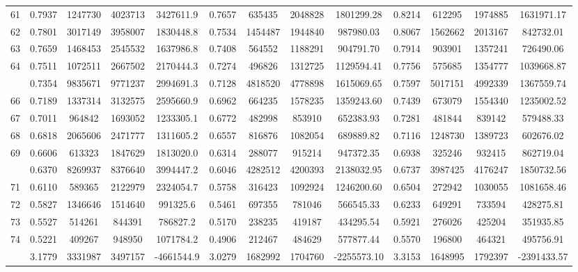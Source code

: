 \documentclass[
  12pt,
]{article}
\begin{document}
\begin{longtable}[t]{lcccccccccccc}
61 & 0.7937 & 1247730 & 4023713 & 3427611.9 & 0.7657 & 635435 & 2048828 & 1801299.28 & 0.8214 & 612295 & 1974885 & 1631971.17\\
62 & 0.7801 & 3017149 & 3958007 & 1830448.8 & 0.7534 & 1454487 & 1944840 & 987980.03 & 0.8067 & 1562662 & 2013167 & 842732.01\\
63 & 0.7659 & 1468453 & 2545532 & 1637986.8 & 0.7408 & 564552 & 1188291 & 904791.70 & 0.7914 & 903901 & 1357241 & 726490.06\\
64 & 0.7511 & 1072511 & 2667502 & 2170444.3 & 0.7274 & 496826 & 1312725 & 1129594.41 & 0.7756 & 575685 & 1354777 & 1039668.87\\
\addlinespace
65 & 0.7354 & 9835671 & 9771237 & 2994691.3 & 0.7128 & 4818520 & 4778898 & 1615069.65 & 0.7597 & 5017151 & 4992339 & 1367559.74\\
66 & 0.7189 & 1337314 & 3132575 & 2595660.9 & 0.6962 & 664235 & 1578235 & 1359243.60 & 0.7439 & 673079 & 1554340 & 1235002.52\\
67 & 0.7011 & 964842 & 1693052 & 1233305.1 & 0.6772 & 482998 & 853910 & 652383.93 & 0.7281 & 481844 & 839142 & 579488.33\\
68 & 0.6818 & 2065606 & 2471777 & 1311605.2 & 0.6557 & 816876 & 1082054 & 689889.82 & 0.7116 & 1248730 & 1389723 & 602676.02\\
69 & 0.6606 & 613323 & 1847629 & 1813020.0 & 0.6314 & 288077 & 915214 & 947372.35 & 0.6938 & 325246 & 932415 & 862719.04\\
\addlinespace
70 & 0.6370 & 8269937 & 8376640 & 3994447.2 & 0.6046 & 4282512 & 4200393 & 2138032.95 & 0.6737 & 3987425 & 4176247 & 1850732.56\\
71 & 0.6110 & 589365 & 2122979 & 2324054.7 & 0.5758 & 316423 & 1092924 & 1246200.60 & 0.6504 & 272942 & 1030055 & 1081658.46\\
72 & 0.5827 & 1346646 & 1514640 & 991325.6 & 0.5461 & 697355 & 781046 & 566545.33 & 0.6233 & 649291 & 733594 & 428275.81\\
73 & 0.5527 & 514261 & 844391 & 786827.2 & 0.5170 & 238235 & 419187 & 434295.54 & 0.5921 & 276026 & 425204 & 351935.85\\
74 & 0.5221 & 409267 & 948950 & 1071784.2 & 0.4906 & 212467 & 484629 & 577877.44 & 0.5570 & 196800 & 464321 & 495756.91\\
\addlinespace
75 & 3.1779 & 3331987 & 3497157 & -4661544.9 & 3.0279 & 1682992 & 1704760 & -2255573.10 & 3.3153 & 1648995 & 1792397 & -2391433.57\\*
\end{longtable}
\endgroup{}
\end{document}
